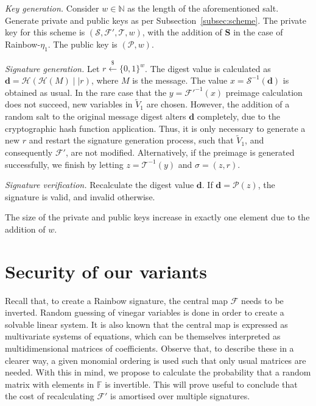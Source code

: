 \documentclass[openright]{report}
\newcommand{\random}{\stackrel{\$}{\longleftarrow}}
\begin{document}
\emph{Key generation.}
Consider $w \in \mathbb{N}$ as the length of the aforementioned salt. Generate
private and public keys as per Subsection~\ref{subsec:scheme}. The private key
for this scheme is $(\mathcal{S}, \mathcal{F}', \mathcal{T}, w)$, with the
addition of $\mathbf{S}$ in the case of Rainbow-$\eta_{1}$. The public key is
$(\mathcal{P}, w)$.

\emph{Signature generation.}
Let $r \random{} {\{0, 1\}}^{w}$. The digest value is calculated as
$\mathbf{d} = \mathcal{H}(\mathcal{H}(M) \mid\mid r)$, where $M$ is the
message. The value $x = \mathcal{S}^{-1}(\mathbf{d})$ is obtained as usual. In
the rare case that the $y = \mathcal{F}'^{-1}(x)$ preimage calculation does not
succeed, new variables in $\widetilde{V}_{1}$ are chosen. However, the
addition of a random salt to the original message digest alters $\mathbf{d}$
completely, due to the cryptographic hash function application. Thus, it is
only necessary to generate a new $r$ and restart the signature generation
process, such that $\widetilde{V}_{1}$, and consequently $\mathcal{F}'$, are
not modified. Alternatively, if the preimage is generated successfully, we
finish by letting $z = \mathcal{T}^{-1}(y)$ and $\sigma = (z, r)$.

\emph{Signature verification.}
Recalculate the digest value $\mathbf{d}$. If $\mathbf{d} = \mathcal{P}(z)$,
the signature is valid, and invalid otherwise.

The size of the private and public keys increase in exactly one element due to
the addition of $w$.

\section{Security of our variants}\label{sec:security}

Recall that, to create a Rainbow signature, the central map $\mathcal{F}$ needs
to be inverted. Random guessing of vinegar variables is done in order to create
a solvable linear system. It is also known that the central map is expressed as
multivariate systems of equations, which can be themselves interpreted as
multidimensional matrices of coefficients. Observe that, to describe these in a
clearer way, a given monomial ordering is used such that only usual matrices
are needed. With this in mind, we propose to calculate the probability that a
random matrix with elements in $\mathbb{F}$ is invertible. This will prove useful
to conclude that the cost of recalculating $\mathcal{F}'$ is amortised over
multiple signatures.
\end{document}
